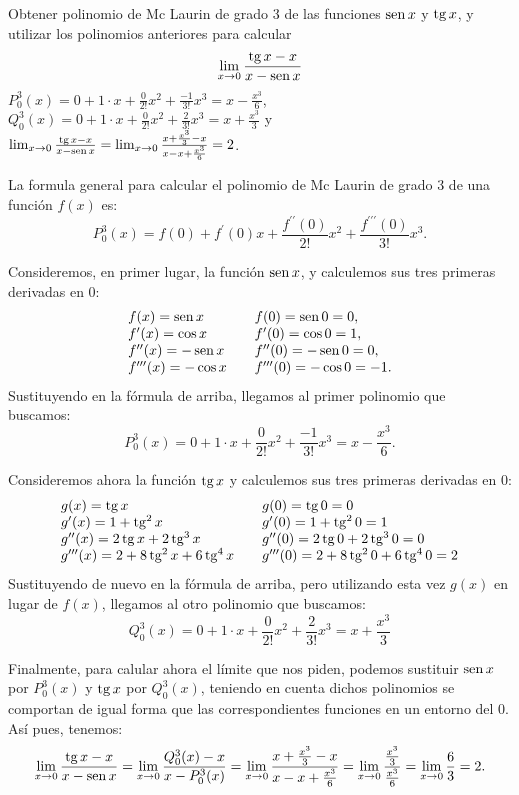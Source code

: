 {Obtener polinomio de Mc Laurin de grado 3 de las funciones $\operatorname{sen} x$ y $\operatorname{tg} x$, y utilizar los polinomios anteriores para calcular
\[
\lim_{x\rightarrow 0}\frac{\operatorname{tg} x-x}{x-\operatorname{sen} x}
\]
}
{$P_{0}^{3}(x)=0+1\cdot x+\frac{0}{2!}x^{2}+\frac{-1}{3!}x^{3}=x-\frac{x^{3}}{6}$,\\
$Q_{0}^{3}(x)=0+1\cdot x+\frac{0}{2!}x^{2}+\frac{2}{3!}x^{3}=x+\frac{x^{3}}{3}$ y \\
$\lim_{x\rightarrow 0}\frac{\operatorname{tg} x-x}{x-\operatorname{sen} x} = \lim_{x\rightarrow 0}\frac{x+\frac{x^{3}}{3}-x}{x-x+\frac{x^{3}}{6}} =2$.
}
{La formula general para calcular el polinomio de Mc Laurin de grado 3 de una función $f(x)$ es:
\[
P_{0}^{3}(x)=f(0)+f^{\prime }(0)x+\frac{f^{\prime \prime }(0)}{2!}x^{2}+\frac{f^{\prime \prime \prime }(0)}{3!}x^{3}.
\]

Consideremos, en primer lugar, la función $\operatorname{sen} x$, y calculemos sus tres primeras derivadas en 0:
\[
\begin{array}{lll}
f(x)=\operatorname{sen} x &  & f(0)=\operatorname{sen} 0=0, \\
f^{\prime }(x)=\cos x &  & f^{\prime }(0)=\cos 0=1, \\
f^{\prime \prime }(x)=-\operatorname{sen} x &  & f^{\prime \prime }(0)=-\operatorname{sen}0=0, \\
f^{\prime \prime \prime }(x)=-\cos x &  & f^{\prime \prime \prime }(0)=-\cos 0=-1.
\end{array}
\]
Sustituyendo en la fórmula de arriba, llegamos al primer polinomio que buscamos:
\[
P_{0}^{3}(x)=0+1\cdot x+\frac{0}{2!}x^{2}+\frac{-1}{3!}x^{3}=x-\frac{x^{3}}{6}.
\]

Consideremos ahora la función $\operatorname{tg} x$ y calculemos sus tres primeras derivadas en 0:
\[
\begin{array}{lll}
g(x)=\operatorname{tg} x &  & g(0)=\operatorname{tg} 0=0 \\
g^{\prime }(x)=1+\operatorname{tg}^{2} x &  & g^{\prime }(0)=1+\operatorname{tg}^{2} 0=1 \\
g^{\prime \prime }(x)= 2\operatorname{tg} x+2\operatorname{tg} ^{3}x &  & g^{\prime \prime}(0)= 2\operatorname{tg} 0+2\operatorname{tg} ^{3}0=0 \\
g^{\prime \prime \prime }(x)=2+ 8\operatorname{tg} ^{2}x+6\operatorname{tg} ^{4}x &  & g^{\prime \prime \prime }(0)= 2+ 8\operatorname{tg} ^{2}0+6\operatorname{tg} ^{4}0=2
\end{array}
\]
Sustituyendo de nuevo en la fórmula de arriba, pero utilizando esta vez $g(x)$ en lugar de $f(x)$, llegamos al otro polinomio que buscamos:
\[
Q_{0}^{3}(x)=0+1\cdot x+\frac{0}{2!}x^{2}+\frac{2}{3!}x^{3}=x+\frac{x^{3}}{3}
\]

Finalmente, para calular ahora el límite que nos piden, podemos sustituir $\operatorname{sen} x$ por $P_{0}^{3}(x)$ y $\operatorname{tg} x$ por $Q_{0}^{3}(x)$, teniendo en cuenta dichos polinomios se comportan de igual forma que las correspondientes funciones en un entorno del 0. Así pues, tenemos:
\[
\lim_{x\rightarrow 0}\frac{\operatorname{tg} x-x}{x-\operatorname{sen} x} = \lim_{x\rightarrow 0}\frac{Q_{0}^{3}(x)-x}{x-P_{0}^{3}(x)} = \lim_{x\rightarrow 0}\frac{x+\frac{x^{3}}{3}-x}{x-x+\frac{x^{3}}{6}} = \lim_{x\rightarrow 0}\frac{\frac{x^{3}}{3}}{\frac{x^{3}}{6}} = \lim_{x\rightarrow 0}\frac{6}{3}=2.
\]
}
